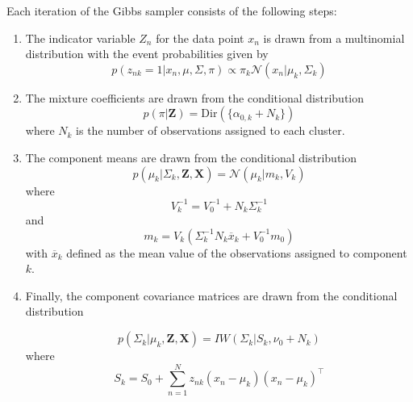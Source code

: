 \documentclass[twoside]{article}
\theoremstyle{theorem}
\theoremstyle{theorem}
\theoremstyle{theorem}
\theoremstyle{lemma}
\theoremstyle{definition}
\theoremstyle{example}
\begin{document}
 Each iteration of the Gibbs sampler consists of the following steps: 
 \begin{enumerate}
\item The indicator variable $Z_n$ for the data point $x_n$ is drawn from a multinomial distribution with the event probabilities given by 
\begin{equation}
p(z_{nk} = 1| x_n, \mu, \Sigma, \pi)  \propto \pi_k \mathcal{N}(x_n | \mu_k, \Sigma_k)\end{equation}

\item The mixture coefficients are drawn from the conditional distribution 
\begin{equation}
p(\pi|\mathbf{Z}) = \mathrm{Dir}(\{\alpha_{0,k}+ N_k\} )
\end{equation}
where $N_k$ is the number of observations assigned to each cluster. 

\item The component means are drawn from the conditional distribution 
\begin{equation}
p(\mu_k | \Sigma_k, \mathbf{Z}, \mathbf{X}) = \mathcal{N}(\mu_k | m_k, V_k)
\end{equation}
where 
\begin{equation}
V_k^{-1} = V_0^{-1} + N_k\Sigma_k^{-1}
\end{equation}
and 
\begin{equation}
 m_k = V_k(\Sigma_k^{-1}N_k\overline{x}_k + V_0^{-1}m_0)
 \end{equation}
 with $\overline{x}_k$  defined as the mean value of the observations assigned to component $k$. 
 
\item Finally, the component covariance matrices are drawn from the conditional distribution 
 
 \begin{equation}
 p(\Sigma_k | \mu_k, \mathbf{Z}, \mathbf{X}) = IW(\Sigma_k | S_k, \nu_0+N_k)
 \end{equation}
 where 
 \begin{equation}
S_k = S_0 + \sum_{n=1}^N z_{nk}(x_n - \mu_k)(x_n - \mu_k)^\top
\end{equation}

\end{enumerate}
\end{document}
